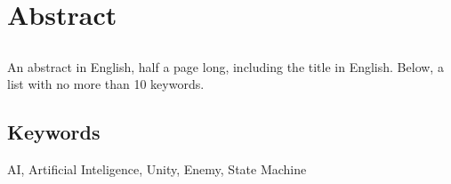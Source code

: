 \chapter*{Abstract}

\section*{\tituloPortadaEngVal}

An abstract in English, half a page long, including the title in English. Below, a list with no more than 10 keywords.


\section*{Keywords}

\noindent AI, Artificial Inteligence, Unity, Enemy, State Machine 



